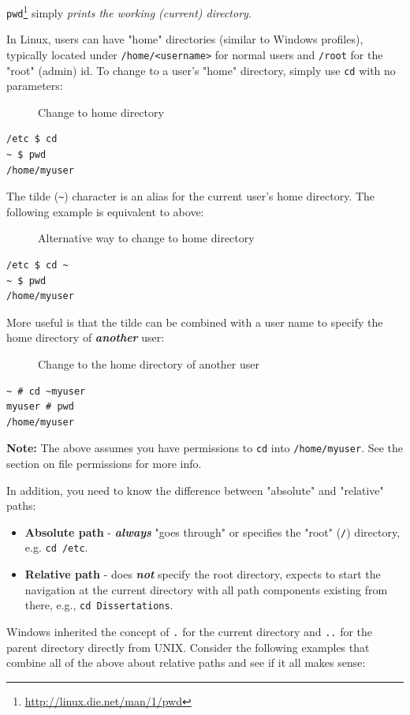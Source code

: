 \documentclass[10pt,]{book}
\renewcommand{\href}[2]{#2\footnote{\url{#1}}}
\numberwithin{figure}{chapter}
\DeclareRobustCommand{\drcap}[1]{\begin{figure}[H]\caption{#1}\end{figure}}
\DeclareRobustCommand{\drcmd}[1]{\index{Commands!#1}}
\begin{document}
\href{http://linux.die.net/man/1/pwd}{\texttt{pwd}}\drcmd{pwd} simply
\emph{prints the working (current) directory}.

In Linux, users can have "home" directories (similar to Windows
profiles), typically located under
\texttt{/home/\textless{}username\textgreater{}} for normal users and
\texttt{/root} for the "root" (admin) id. To change to a user's "home"
directory, simply use \texttt{cd} with no parameters:

\drcap{Change to home directory}

\begin{verbatim}
/etc $ cd
~ $ pwd
/home/myuser
\end{verbatim}

The tilde (\texttt{\textasciitilde{}}) character is an alias for the
current user's home directory. The following example is equivalent to
above:

\drcap{Alternative way to change to home directory}

\begin{verbatim}
/etc $ cd ~
~ $ pwd
/home/myuser
\end{verbatim}

More useful is that the tilde can be combined with a user name to
specify the home directory of \textbf{\emph{another}} user:

\drcap{Change to the home directory of another user}

\begin{verbatim}
~ # cd ~myuser
myuser # pwd
/home/myuser
\end{verbatim}

\textbf{Note:} The above assumes you have permissions to \texttt{cd}
into \texttt{/home/myuser}. See the section on file permissions for more
info.

In addition, you need to know the difference between "absolute" and
"relative" paths:

\begin{itemize}
\item
  \textbf{Absolute path} - \textbf{\emph{always}} "goes through" or
  specifies the "root" (\texttt{/}) directory, e.g. \texttt{cd /etc}.
\item
  \textbf{Relative path} - does \textbf{\emph{not}} specify the root
  directory, expects to start the navigation at the current directory
  with all path components existing from there, e.g.,
  \texttt{cd Dissertations}.
\end{itemize}

Windows inherited the concept of \texttt{.} for the current directory
and \texttt{..} for the parent directory directly from UNIX. Consider
the following examples that combine all of the above about relative
paths and see if it all makes sense:
\end{document}
